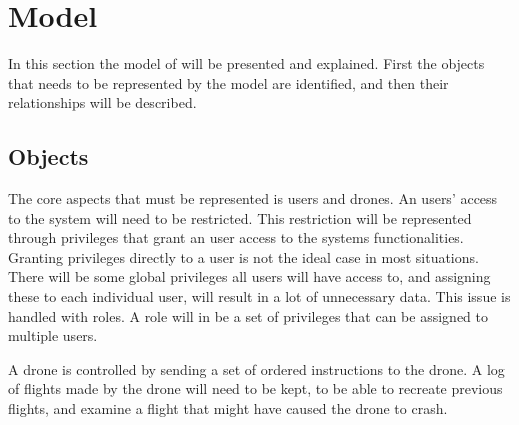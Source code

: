 \section{Model}
In this section the model of \projectname{} will be presented and explained.
First the objects that needs to be represented by the model are identified, and then their relationships will be described.

\subsection{Objects}
The core aspects that must be represented is users and drones.
An users' access to the system will need to be restricted.
This restriction will be represented through privileges that grant an user access to the systems functionalities.
Granting privileges directly to a user is not the ideal case in most situations.
There will be some global privileges all users will have access to, and assigning these to each individual user, will result in a lot of unnecessary data.
This issue is handled with roles.
A role will in \projectname{} be a set of privileges that can be assigned to multiple users.

A drone is controlled by sending a set of ordered instructions to the drone.
A log of flights made by the drone will need to be kept, to be able to recreate previous flights, and examine a flight that might have caused the drone to crash.

